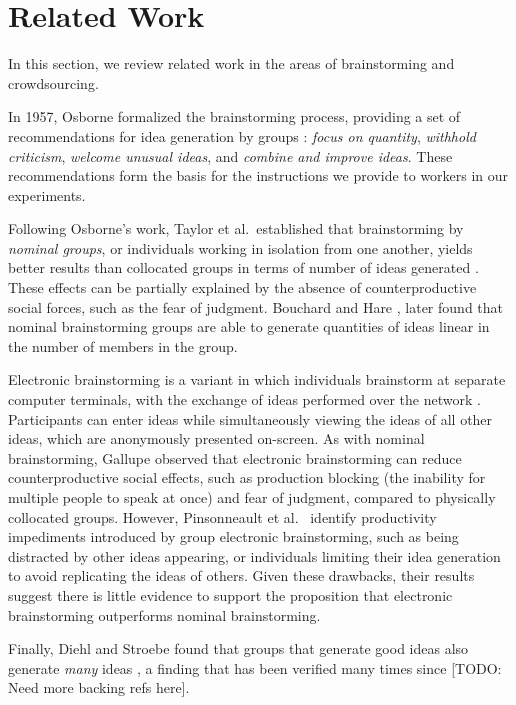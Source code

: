 \section{Related Work}
In this section, we review related work in the areas of brainstorming and crowdsourcing.

In 1957, Osborne formalized the brainstorming process, providing a set of recommendations for idea generation by groups \cite{osborn_applied_1957}: \emph{focus on quantity}, \emph{withhold criticism}, \emph{welcome unusual ideas}, and \emph{combine and improve ideas}. These recommendations form the basis for the instructions we provide to workers in our experiments.

Following Osborne's work, Taylor et al.\ established that brainstorming by \emph{nominal groups}, or individuals working in isolation from one another, yields better results than collocated groups in terms of number of ideas generated \cite{taylor_does_1958}. These effects can be partially explained by the absence of counterproductive social forces, such as the fear of judgment. Bouchard and Hare \cite{bouchard_jr_size_1970}, later found that nominal brainstorming groups are able to generate quantities of ideas linear in the number of members in the group.

Electronic brainstorming is a variant in which individuals brainstorm at separate computer terminals, with the exchange of ideas performed over the network \cite{gallupe_electronic_1992}. Participants can enter ideas while simultaneously viewing the ideas of all other ideas, which are anonymously presented on-screen. As with nominal brainstorming, Gallupe \cite{gallupe_electronic_1992} observed that electronic brainstorming can reduce counterproductive social effects, such as production blocking (the inability for multiple people to speak at once) and fear of judgment, compared to physically collocated groups. However, Pinsonneault et al.\ \cite{pinsonneault_electronic_1999} identify productivity impediments introduced by group electronic brainstorming, such as being distracted by other ideas appearing, or individuals limiting their idea generation to avoid replicating the ideas of others. Given these drawbacks, their results suggest there is little evidence to support the proposition that electronic brainstorming outperforms nominal brainstorming.

Finally, Diehl and Stroebe found that groups that generate good ideas also generate \emph{many} ideas \cite{diehl_productivity_1987}, a finding that has been verified many times since [TODO: Need more backing refs here].

